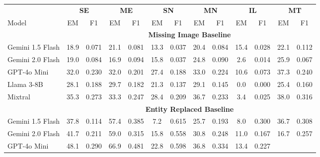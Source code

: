 \documentclass[11pt]{article}
\begin{document}
\begin{table}[h]
\vspace{-0.5em}
\scriptsize
\centering
\setlength{\aboverulesep}{0pt}
\setlength{\belowrulesep}{0pt}
\setlength{\tabcolsep}{8.5pt}
\begin{tabular}{lcc|cc|cc|cc|cc|cc}
\toprule
\multicolumn{1}{c}{} & \multicolumn{2}{c|}{\textbf{SE}} & \multicolumn{2}{c|}{\textbf{ME}} & \multicolumn{2}{c|}{\textbf{SN}} & \multicolumn{2}{c|}{\textbf{MN}} & \multicolumn{2}{c|}{\textbf{IL}} & \multicolumn{2}{c}{\textbf{MT}} \\
\cmidrule{2-13}
Model & EM & F1 & EM & F1 & EM & F1 & EM & F1 & EM & F1 & EM & F1 \\
\cmidrule{2-13}
& \multicolumn{12}{c}{\textbf{Missing Image Baseline}} \\
\cmidrule{2-13}
Gemini 1.5 Flash 
 & 18.9   & 0.071 
 & 21.1   & 0.081 
 & 13.3   & 0.037 
 & 20.4   & 0.084 
 & \cellcolor{yellow}15.4 & 0.028 
 & 22.1   & 0.112 \\
Gemini 2.0 Flash 
 & 19.0   & 0.084 
 & 16.9   & 0.094 
 & 15.8   & 0.037 
 & 24.8   & 0.090 
 & 2.6    & 0.014 
 & 25.9   & 0.067 \\
GPT-4o Mini 
 & 32.0   & 0.230 
 & 32.0   & 0.201 
 & 27.4   & 0.188 
 & 33.0   & 0.224 
 & 10.6   & \cellcolor{yellow}0.073 
 & 37.3   & 0.240 \\
Llama 3-8B 
 & 28.1   & 0.188 
 & 29.7   & 0.182 
 & 21.3   & 0.137 
 & 29.1   & 0.145 
 & 0.0    & 0.000 
 & 25.4   & 0.160 \\
Mixtral 
 & \cellcolor{yellow}35.3 & \cellcolor{yellow}0.273 
 & \cellcolor{yellow}33.3 & \cellcolor{yellow}0.247 
 & \cellcolor{yellow}28.4 & \cellcolor{yellow}0.209 
 & \cellcolor{yellow}36.7 & \cellcolor{yellow}0.233 
 & 3.4    & 0.025 
 & \cellcolor{yellow}38.0 & \cellcolor{yellow}0.316 \\
\cmidrule{2-13}
& \multicolumn{12}{c}{\textbf{Entity Replaced Baseline}} \\
\cmidrule{2-13}
Gemini 1.5 Flash 
 & 37.8   & 0.114 
 & 57.4   & 0.385 
 & 7.2    & \cellcolor{yellow}0.615 
 & 25.7   & 0.193 
 & 8.0    & \cellcolor{yellow}0.300 
 & \cellcolor{yellow}36.7 & 0.308 \\
Gemini 2.0 Flash 
 & 41.7   & 0.211 
 & 59.0   & 0.315 
 & 15.8   & 0.558 
 & 30.8   & 0.248 
 & 11.0   & 0.167 
 & 16.7   & 0.257 \\
GPT-4o Mini 
 & \cellcolor{yellow}48.1 & 0.290 
 & \cellcolor{yellow}66.9 & \cellcolor{yellow}0.481 
 & 22.8   & 0.598 
 & \cellcolor{yellow}36.8 & 0.334 
 & 13.4   & 0.227 

\end{tabular}
\end{table}
\end{document}
